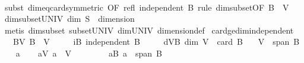 \begin{isabellebody}
%
\isadelimproof
\ \ %
\endisadelimproof
%
\isatagproof
{}\isamarkupfalse%
\ {\isacharparenleft}{\kern0pt}subst\ dim{\isacharunderscore}{\kern0pt}eq{\isacharunderscore}{\kern0pt}card{\isacharbrackleft}{\kern0pt}symmetric{\isacharcomma}{\kern0pt}\ OF\ refl\ {\isacartoucheopen}independent\ B{\isacartoucheclose}{\isacharbrackright}{\kern0pt}{\isacharparenright}{\kern0pt}\ {\isacharparenleft}{\kern0pt}rule\ dim{\isacharunderscore}{\kern0pt}subset{\isacharbrackleft}{\kern0pt}OF\ {\isacartoucheopen}B\ {\isasymsubseteq}\ V{\isacartoucheclose}{\isacharbrackright}{\kern0pt}{\isacharparenright}{\kern0pt}%
\endisatagproof
{\isafoldproof}%
%
\isadelimproof
\isanewline
%
\endisadelimproof
\isanewline
{}\isamarkupfalse%
\ dim{\isacharunderscore}{\kern0pt}subset{\isacharunderscore}{\kern0pt}UNIV{\isacharcolon}{\kern0pt}\ {\isachardoublequoteopen}dim\ S\ {\isasymle}\ dimension{\isachardoublequoteclose}\isanewline
%
\isadelimproof
\ \ %
\endisadelimproof
%
\isatagproof
{}\isamarkupfalse%
\ {\isacharparenleft}{\kern0pt}metis\ dim{\isacharunderscore}{\kern0pt}subset\ subset{\isacharunderscore}{\kern0pt}UNIV\ dim{\isacharunderscore}{\kern0pt}UNIV\ dimension{\isacharunderscore}{\kern0pt}def{\isacharparenright}{\kern0pt}%
\endisatagproof
{\isafoldproof}%
%
\isadelimproof
\isanewline
%
\endisadelimproof
\isanewline
{}\isamarkupfalse%
\ card{\isacharunderscore}{\kern0pt}ge{\isacharunderscore}{\kern0pt}dim{\isacharunderscore}{\kern0pt}independent{\isacharcolon}{\kern0pt}\isanewline
\ \ \ BV{\isacharcolon}{\kern0pt}\ {\isachardoublequoteopen}B\ {\isasymsubseteq}\ V{\isachardoublequoteclose}\isanewline
\ \ \ \ \ iB{\isacharcolon}{\kern0pt}\ {\isachardoublequoteopen}independent\ B{\isachardoublequoteclose}\isanewline
\ \ \ \ \ dVB{\isacharcolon}{\kern0pt}\ {\isachardoublequoteopen}dim\ V\ {\isasymle}\ card\ B{\isachardoublequoteclose}\isanewline
\ \ \ {\isachardoublequoteopen}V\ {\isasymsubseteq}\ span\ B{\isachardoublequoteclose}\isanewline
%
\isadelimproof
%
\endisadelimproof
%
\isatagproof
{}\isamarkupfalse%
\isanewline
\ \ \isamarkupfalse%
\ a\isanewline
\ \ \isamarkupfalse%
\ aV{\isacharcolon}{\kern0pt}\ {\isachardoublequoteopen}a\ {\isasymin}\ V{\isachardoublequoteclose}\isanewline
\ \ \isacommand{{\isacharbraceleft}{\kern0pt}}\isamarkupfalse%
\isanewline
\ \ \ \ \isamarkupfalse%
\ aB{\isacharcolon}{\kern0pt}\ {\isachardoublequoteopen}a\ {\isasymnotin}\ span\ B{\isachardoublequoteclose}\isanewline

\end{isabellebody}
